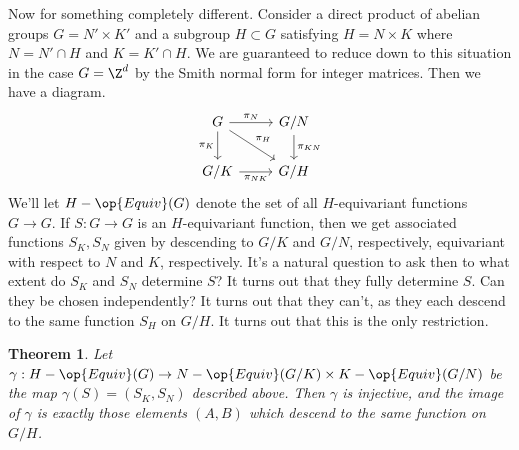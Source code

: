 \documentclass[12nt]{article}
\theoremstyle{plain}
\newtheorem{theorem}{Theorem}
\begin{document}
Now for something completely different. Consider a direct product of abelian groups $G = N' \times K'$ and a subgroup $H \subset G$ satisfying $H = N \times K$ where $N = N' \cap H$ and $K = K' \cap H$. We are guaranteed to reduce down to this situation in the case $G = \Z^d$ by the Smith normal form for integer matrices. Then we have a diagram.
\[
\begin{tikzcd}
G\ar[d, "\pi_K"'] \ar[dr, "\pi_H"] \ar[r, "\pi_N"] & G/N \ar[d, "\pi_{KN}"] \\
G/K \ar[r, "\pi_{NK}"'] & G/H
\end{tikzcd}
\]
We'll let $H-\op{Equiv}(G)$ denote the set of all $H$-equivariant functions $G \to G$. If $S : G \to G$ is an $H$-equivariant function, then we get associated functions $S_K, S_N$ given by descending to $G/K$ and $G/N$, respectively, equivariant with respect to $N$ and $K$, respectively. It's a natural question to ask then to what extent do $S_K$ and $S_N$ determine $S$? It turns out that they fully determine $S$. Can they be chosen independently? It turns out that they can't, as they each descend to the same function $S_H$ on $G/H$. It turns out that this is the only restriction.

\begin{theorem}
Let $\gamma : H-\op{Equiv}(G) \to N-\op{Equiv}(G/K) \times K-\op{Equiv}(G/N)$ be the map $\gamma(S) = (S_K, S_N)$ described above. Then $\gamma$ is injective, and the image of $\gamma$ is exactly those elements $(A, B)$ which descend to the same function on $G/H$.
\end{theorem}
\end{document}
